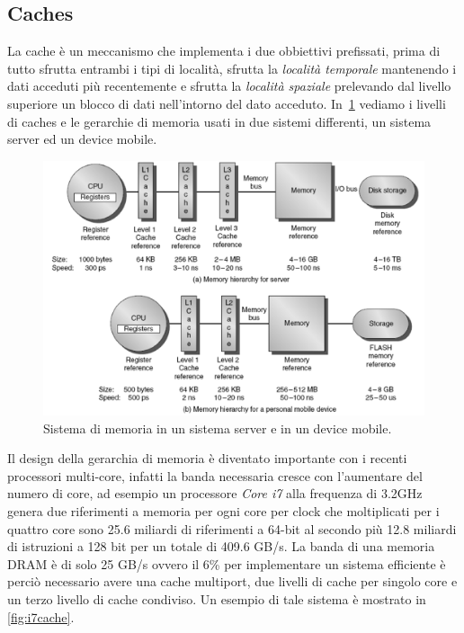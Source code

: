 \subsection{Caches}
La cache è un meccanismo che implementa i due obbiettivi prefissati, prima di tutto sfrutta entrambi i tipi di località, sfrutta la \emph{località temporale} mantenendo i dati acceduti più recentemente e sfrutta la \emph{località spaziale} prelevando dal livello superiore un blocco di dati nell'intorno del dato acceduto.
In \figurename\,\ref{fig:levelsmem} vediamo i livelli di caches e le gerarchie di memoria usati in due sistemi differenti, un sistema server ed un device mobile.
\begin{figure}[htb]
\centering
\includegraphics[scale=0.5]{img/levelsmem.png}
\caption{Sistema di memoria in un sistema server e in un device mobile.}\label{fig:levelsmem}
\end{figure}
Il design della gerarchia di memoria è diventato importante con i recenti processori multi-core, infatti la banda necessaria cresce con l'aumentare del numero di core, ad esempio un processore \emph{Core i7} alla frequenza di 3.2GHz genera due riferimenti a memoria per ogni core per clock che moltiplicati per i quattro core sono 25.6 miliardi di riferimenti a 64-bit al secondo più 12.8 miliardi di istruzioni a 128 bit per un totale di 409.6 GB/s. La banda di una memoria DRAM è di solo 25 GB/s ovvero il 6\% per implementare un sistema efficiente è perciò necessario avere una cache multiport, due livelli di cache per singolo core e un terzo livello di cache condiviso. Un esempio di tale sistema è mostrato in \figurename\,\ref{fig:i7cache}.
